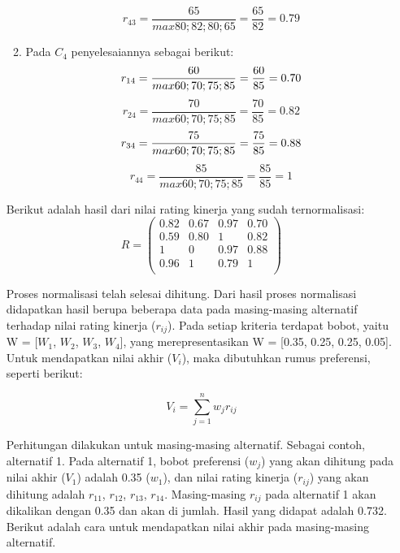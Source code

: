 \documentclass[a4paper,twoside]{article}
\begin{document}
\begin{enumerate}
\begin{enumerate}
\begin{displaymath}
r_{43} = \frac{65}{max {80;82;80;65}} = \frac{65}{82} = 0.79
\end{displaymath}
\item Pada $C_{4}$ penyelesaiannya sebagai berikut:
\begin{displaymath}
r_{14} = \frac{60}{max {60;70;75;85}} = \frac{60}{85} = 0.70\\
\end{displaymath}
\begin{displaymath}
r_{24} = \frac{70}{max {60;70;75;85}} = \frac{70}{85} = 0.82
\end{displaymath}
\begin{displaymath}
r_{34} = \frac{75}{max {60;70;75;85}} = \frac{75}{85} = 0.88\\
\end{displaymath}
\begin{displaymath}
r_{44} = \frac{85}{max {60;70;75;85}} = \frac{85}{85} = 1
\end{displaymath}
\end{enumerate}

Berikut adalah hasil dari nilai rating kinerja yang sudah ternormalisasi:
\begin{displaymath} R = 
\left (
\begin{array}{rrrrrrr}
0.82 & 0.67 & 0.97 & 0.70\\		
0.59 & 0.80 & 1 & 0.82\\
1 & 0 & 0.97 & 0.88 \\
0.96 & 1 & 0.79 & 1 \\
\end{array}\right )	
\end{displaymath}



Proses normalisasi telah selesai dihitung. Dari hasil proses normalisasi didapatkan hasil berupa beberapa data pada masing-masing alternatif terhadap nilai rating kinerja ($r_{ij}$). Pada setiap kriteria terdapat bobot, yaitu W = [$W_{1}$, $W_{2}$, $W_{3}$, $W_{4}$], yang merepresentasikan W = [0.35, 0.25, 0.25, 0.05]. Untuk mendapatkan nilai akhir ($V_{i}$), maka dibutuhkan rumus preferensi, seperti berikut:

\[
 V_{i} =\displaystyle\sum_{j=1}^{n} w_{j} r_{ij}
\]

Perhitungan dilakukan untuk masing-masing alternatif. Sebagai contoh, alternatif 1. Pada alternatif 1, bobot preferensi ($w_{j}$) yang akan dihitung pada nilai akhir ($V_{1}$) adalah 0.35 ($w_{1}$), dan nilai rating kinerja ($r_{ij}$) yang akan dihitung adalah $r_{11}$, $r_{12}$, $r_{13}$, $r_{14}$. Masing-masing $r_{ij}$ pada alternatif 1 akan dikalikan dengan 0.35 dan akan di jumlah. Hasil yang didapat adalah 0.732. Berikut adalah cara untuk mendapatkan nilai akhir pada masing-masing alternatif.


\end{enumerate}
\end{document}
